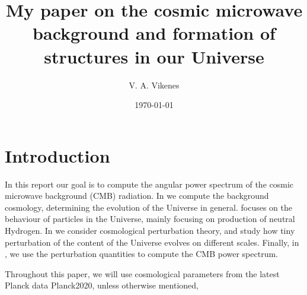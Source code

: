 \documentclass{aa}
\begin{document}
 
   \title{My paper on the cosmic microwave background and formation of structures in our Universe}

   \author{V. A. Vikenes}
 

   \date{\today}



   \maketitle

\section{Introduction}
In this report our goal is to compute the angular power spectrum of the cosmic microwave background (CMB) radiation. In  we compute the background cosmology, determining the evolution of the Universe in general.  focuses on the behaviour of particles in the Universe, mainly focusing on production of neutral Hydrogen. In  we consider cosmological perturbation theory, and study how tiny perturbation of the content of the Universe evolves on different scales. Finally, in , we use the perturbation quantities to compute the CMB power spectrum.  

Throughout this paper, we will use cosmological parameters from the latest Planck data {Planck2020}, unless otherwise mentioned,
\end{document}
